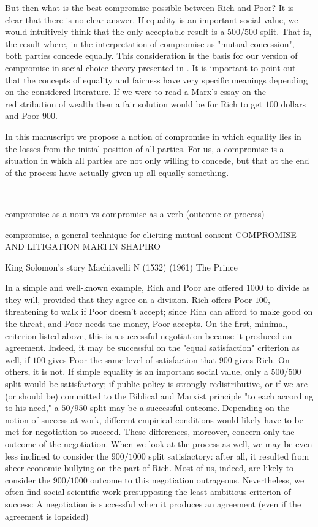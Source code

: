 But then what is the best compromise possible between Rich and Poor? It is clear that there is no clear answer.
If equality is an important social value, we would intuitively think that the only acceptable result is a $500/500$ split. That is, the result where, in the interpretation of compromise as "mutual concession", both parties concede equally.
This consideration is the basis for our version of compromise in social choice theory presented in .
It is important to point out that the concepts of equality and fairness have very specific meanings depending on the considered literature. 
If we were to read a Marx's essay on the redistribution of wealth then a fair solution would be for Rich to get $100$ dollars and Poor $900$.

In this manuscript we propose a notion of compromise in which equality lies in the losses from the initial position of all parties. For us, a compromise is a situation in which all parties are not only willing to concede, but that at the end of the process have actually given up all equally something.



--------------

compromise as a noun vs compromise as a verb (outcome or process)

compromise, a general technique for eliciting mutual consent  COMPROMISE AND LITIGATION MARTIN SHAPIRO \cite{Shapiro1979}

King Solomon’s story
Machiavelli N (1532) (1961) The Prince

\cite{Luban1985}
In a simple and well-known example, Rich and Poor are offered $1000$ to divide as they will, provided that they agree on a division. Rich offers Poor $100$, threatening to walk if Poor doesn't accept; since Rich can afford to make good on the threat, and Poor needs the money, Poor accepts. On the first, minimal, criterion listed above, this is a successful negotiation because it produced an agreement. Indeed, it may be successful on the "equal satisfaction" criterion as well, if $100$ gives Poor the same level of satisfaction that $900$ gives Rich. On others, it is not. If simple equality is an important social value, only a $500/500$ split would be satisfactory; if public policy is strongly redistributive, or if we are (or should be) committed to the Biblical and Marxist principle "to each according to his need," a $50/950$ split may be a successful outcome. Depending on the notion of success at work, different empirical conditions would likely have to be met for negotiation to succeed. These differences, moreover, concern only the outcome of the negotiation. When we look at the process as well, we may be even less inclined to consider the $900/1000$ split satisfactory: after all, it resulted from sheer economic bullying on the part of Rich. Most of us, indeed, are likely
to consider the $900/1000$ outcome to this negotiation outrageous. Nevertheless, we often find social scientific work presupposing the least ambitious criterion of success: A negotiation is successful when it produces an agreement (even if the agreement is lopsided)


